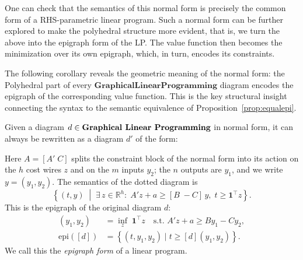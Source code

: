 One can check that the semantics of this normal form is precisely the common
form of a RHS-parametric linear program. Such a normal form can be further
explored to make the polyhedral
structure more evident, that is, we turn the above into the epigraph form of the LP.
The value function then becomes the minimization over its own epigraph, which, in turn,
encodes its constraints.

The following corollary reveals the geometric meaning of the normal form:
the Polyhedral part of every $\mathbf{Graphical Linear Programming}$ diagram encodes the
epigraph of the corresponding value function. This is the key structural
insight connecting the syntax to the semantic equivalence of
Proposition~\ref{prop:equalepi}.

\begin{corollary}\label{cor:epigraph form}
    Given a diagram $d \in \text{\bfseries Graphical Linear Programming}$ in normal form, it can always
    be rewritten as a diagram $d'$ of the form:
    \begin{figure}[H]
        \centering
        
    \end{figure}
    Here $A=[A'\;C]$ splits the constraint block of the normal form into
    its action on the $h$ cost wires $z$ and on the $m$ inputs $y_2$; the
    $n$ outputs are $y_1$, and we write $y=(y_1,y_2)$. The semantics of
    the dotted diagram is
    \[
        \left\{(t,y)\;\middle|\; \exists\, z\in\mathbb{R}^h:\;
        A'z + a \ge [B\; -C]\, y,\; t\ge \mathbf{1}^\top z\right\}.
    \]
    This is the epigraph of the original diagram $d$:
    \begin{align*}
        [d](y_1, y_2) &= \inf_{z} \; \mathbf{1}^\top z \quad \text{s.t. } A' z + a \ge B y_1 - C y_2, \\
        \mathrm{epi}([d]) &= \left\{(t, y_1, y_2) \mid t \ge [d](y_1,y_2)\right\}.
    \end{align*}
    We call this the \emph{epigraph form} of a linear program.
\end{corollary}

